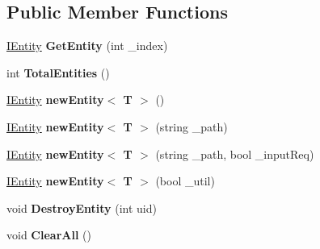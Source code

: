 \subsection*{Public Member Functions}
\begin{DoxyCompactItemize}
\item 
\mbox{\label{interface_g_m_t_b_1_1_interfaces_1_1_i_entity___manager_afeab619a9fdea37a44adc464b9a1395d}} 
\mbox{\hyperlink{interface_g_m_t_b_1_1_interfaces_1_1_i_entity}{I\+Entity}} {\bfseries Get\+Entity} (int \+\_\+index)
\item 
\mbox{\label{interface_g_m_t_b_1_1_interfaces_1_1_i_entity___manager_a5dc452ea1122b4e29fe1572612682c7d}} 
int {\bfseries Total\+Entities} ()
\item 
\mbox{\label{interface_g_m_t_b_1_1_interfaces_1_1_i_entity___manager_a8e32422ab19babf5878e44fca8027570}} 
\mbox{\hyperlink{interface_g_m_t_b_1_1_interfaces_1_1_i_entity}{I\+Entity}} {\bfseries new\+Entity$<$ T $>$} ()
\item 
\mbox{\label{interface_g_m_t_b_1_1_interfaces_1_1_i_entity___manager_a55fbda7c2515e11e794feacdc342383d}} 
\mbox{\hyperlink{interface_g_m_t_b_1_1_interfaces_1_1_i_entity}{I\+Entity}} {\bfseries new\+Entity$<$ T $>$} (string \+\_\+path)
\item 
\mbox{\label{interface_g_m_t_b_1_1_interfaces_1_1_i_entity___manager_a1aaad5a17bd7ba806a8d222e348c2865}} 
\mbox{\hyperlink{interface_g_m_t_b_1_1_interfaces_1_1_i_entity}{I\+Entity}} {\bfseries new\+Entity$<$ T $>$} (string \+\_\+path, bool \+\_\+input\+Req)
\item 
\mbox{\label{interface_g_m_t_b_1_1_interfaces_1_1_i_entity___manager_a5b5794283baecd33c8629b40a8c57481}} 
\mbox{\hyperlink{interface_g_m_t_b_1_1_interfaces_1_1_i_entity}{I\+Entity}} {\bfseries new\+Entity$<$ T $>$} (bool \+\_\+util)
\item 
\mbox{\label{interface_g_m_t_b_1_1_interfaces_1_1_i_entity___manager_a1902a689567242bd6d954b78f0fc4330}} 
void {\bfseries Destroy\+Entity} (int uid)
\item 
\mbox{\label{interface_g_m_t_b_1_1_interfaces_1_1_i_entity___manager_ac7dee57e59dd51293df02e036cfccbba}} 
void {\bfseries Clear\+All} ()
\end{DoxyCompactItemize}

